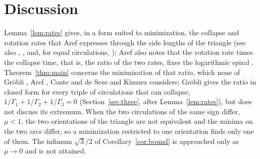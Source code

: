 \documentclass[11pt]{article}
\theoremstyle{definition}
\begin{document}
\section{Discussion}\label{sec:discussion}

Lemma~\ref{lem:rates} gives, in a form suited to minimization, the collapse and rotation rates that Aref \cite[Eqs.~(25a), (25d)]{aref2010} expresses through the side lengths of the triangle (see also \cite{gotoda2021}, \cite[Eq.~(E.1)]{gallay2026}, and, for equal circulations, \cite[Eq.~(4.4)]{kimura1987}); Aref also notes that the rotation rate times the collapse time, that is, the ratio of the two rates, fixes the logarithmic spiral \cite[Eq.~(29c)]{aref2010}. Theorem~\ref{thm:main} concerns the minimization of that ratio, which none of Gr\"obli \cite[\S~10]{grobli1877}, Aref \cite{aref2010}, Conte and de Seze \cite{cds1980} and Kimura \cite{kimura1987} considers; Gr\"obli gives the ratio in closed form for every triple of circulations that can collapse, $1/\Gamma_1 + 1/\Gamma_2 + 1/\Gamma_3 = 0$ (Section~\ref{sec:three}, after Lemma~\ref{lem:rates}), but does not discuss its extremum. When the two circulations of the same sign differ, $\mu < 1$, the two orientations of the triangle are not equivalent and the minima on the two arcs differ, so a minimization restricted to one orientation finds only one of them. The infimum $\sqrt{3}/2$ of Corollary~\ref{cor:bound} is approached only as $\mu \to 0$ and is not attained.
\end{document}
